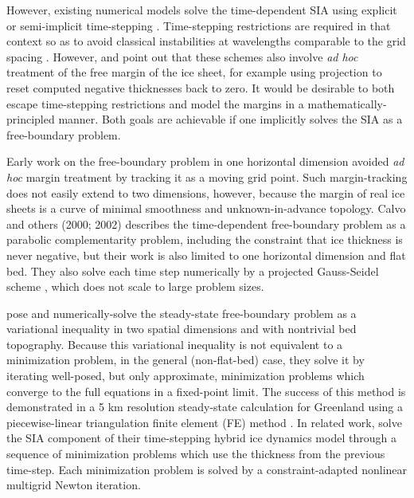 \documentclass[review,letterpaper]{igs}
\begin{document}
However, existing numerical models solve the time-dependent SIA using explicit or semi-implicit time-stepping  \citep{HindmarshPayne1996,Huybrechtsetal1996,Bueleretal2005,EgholmNielsen2010,JaroschSchoofAnslow2013}.  Time-stepping restrictions are required in that context so as to avoid classical instabilities at wavelengths comparable to the grid spacing \citep{MortonMayers2005}.  However, \cite{Bueleretal2005} and \cite{JaroschSchoofAnslow2013} point out that these schemes also involve \emph{ad hoc} treatment of the free margin of the ice sheet, for example using projection to reset computed negative thicknesses back to zero.  It would be desirable to both escape time-stepping restrictions and model the margins in a mathematically-principled manner.  Both goals are achievable if one implicitly solves the SIA as a free-boundary problem.

Early work on the free-boundary problem in one horizontal dimension \citep{Hindmarshetal1987} avoided \emph{ad hoc} margin treatment by tracking it as a moving grid point.  Such margin-tracking does not easily extend to two dimensions, however, because the margin of real ice sheets is a curve of minimal smoothness and unknown-in-advance topology.  Calvo and others (2000; 2002) \nocite{CalvoDuranyVazquez2000,Calvoetal2002} describes the time-dependent free-boundary problem as a parabolic complementarity problem, including the constraint that ice thickness is never negative, but their work is also limited to one horizontal dimension and flat bed.  They also solve each time step numerically by a projected Gauss-Seidel scheme \citep{Ciarlet2002}, which does not scale to large problem sizes.

\cite{JouvetBueler2012} pose and numerically-solve the steady-state free-boundary problem as a variational inequality \citep{KinderlehrerStampacchia1980} in two spatial dimensions and with nontrivial bed topography.  Because this variational inequality is not equivalent to a minimization problem, in the general (non-flat-bed) case, they solve it by iterating well-posed, but only approximate, minimization problems which converge to the full equations in a fixed-point limit.  The success of this method is demonstrated in a 5 km resolution steady-state calculation for Greenland using a piecewise-linear triangulation finite element (FE) method \citep{Elmanetal2005}.  In related work, \cite{JouvetGraeser2013} solve the SIA component of their time-stepping hybrid \citep{Winkelmannetal2011} ice dynamics model through a sequence of minimization problems which use the thickness from the previous time-step.  Each minimization problem is solved by a constraint-adapted nonlinear multigrid Newton iteration.
\end{document}
